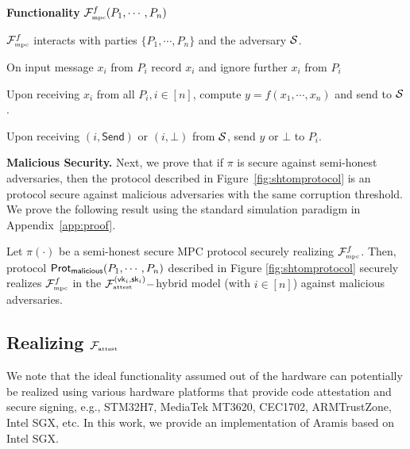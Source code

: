 \begin{tffbox}
\begin{mdframed}
\begin{center}
{\bf Functionality} $\mathcal{F}_{\textrm{\tiny{mpc}}}^f(P_1,\cdots,P_n)$
\end{center}
{\small

$\fmpc^f$ interacts with parties $\{P_1,\cdots,P_n\}$ and the adversary $\mathcal{S}$.

\begin{tiret}
       \item On input message $x_i$ from $P_i$ record $x_i$ and ignore further $x_i$ from $P_i$
       \item Upon receiving $x_i$ from all $P_i, i\in [n]$, compute $y = f(x_1,\cdots,x_n)$ and send to $\mathcal{S}$.
       \item Upon receiving $(i,\mathsf{Send})$ or $(i,\bot)$ from $\mathcal{S}$, send $y$ or $\bot$ to $P_i$.
	       			

	       			\end{tiret}
} %
\end{mdframed}
\caption{\sl The MPC functionality $\fmpc^f$.}
\label{fig:fideal}
\end{tffbox}

\noindent\textbf{Malicious Security.} Next, we prove that if $\pi$ is secure against semi-honest adversaries, then the protocol described in Figure~\ref{fig:shtomprotocol} is an \mpc protocol secure against malicious adversaries with the same corruption threshold.  We prove the following result using the standard simulation paradigm in Appendix~\ref{app:proof}.

\begin{theorem}
\label{theorem:maliciousmpc}
Let $\pi(\cdot)$ be a semi-honest secure MPC protocol securely realizing $\fmpc^f$. Then, protocol $\mathsf{Prot}_{\tiny{\mathsf{malicious}}}(P_1,\cdots,P_n)$ described in Figure \ref{fig:shtomprotocol} securely realizes $\fmpc^f$ in the $\mathcal{F}_{\textrm{\tiny{attest}}}^{(\mathsf{vk}_i,\mathsf{sk}_i)}-$hybrid model (with $i \in [n]$) against malicious adversaries.
\end{theorem}

\subsection{Realizing $\mathcal{F}_{\textrm{\tiny{attest}}}$}
\label{sec:fattest-sgx}
We note that the ideal functionality assumed out of the hardware can potentially be realized using various hardware platforms that provide code attestation and secure signing, e.g., STM32H7, MediaTek MT3620, CEC1702, ARMTrustZone, Intel SGX, etc. In this work, we provide an implementation of Aramis based on Intel SGX. 

